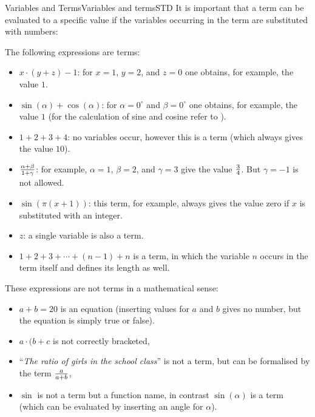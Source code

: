 \begin{MXContent}{Variables and Terms}{Variables and terms}{STD}
It is important that a term can be evaluated to a specific value if the variables occurring in the term are substituted 
with numbers:
\newpage
\begin{MExample}
The following expressions are terms:
\begin{itemize}
\item{$x\cdot (y+z)-1$: for $x=1$, $y=2$, and $z=0$ one obtains, for example, the value $1$.}
\item{$\sin(\alpha)+\cos(\alpha)$: for $\alpha=0^\circ$ and $\beta=0^\circ$ one obtains, for example, the value $1$ 
(for the calculation of sine and cosine refer to ).}
\item{$1+2+3+4$: no variables occur, however this is a term (which always gives the value $10$).}
\item{$\tfrac{\alpha+\beta}{1+\gamma}$: for example, $\alpha=1$, $\beta=2$, and $\gamma=3$ give the value 
$\tfrac{3}{4}$. But $\gamma=-1$ is not allowed.}
\item{$\sin(\pi (x+1))$: this term, for example, always gives the value zero if $x$ is substituted with an integer.}
\item{$z$: a single variable is also a term.}
\item{$1+2+3+\cdots+(n-1)+n$ is a term, in which the variable $n$ occurs in the term itself and defines 
its length as well.}
\end{itemize}
\end{MExample}

\begin{MExample}
These expressions are not terms in a mathematical sense:
\begin{itemize}
\item{$a+b=20$ is an equation (inserting values for $a$ and $b$ gives no number, but the equation is simply true or false).}
\item{$a\cdot (b+c$ is not correctly bracketed,}
\item{``\textit{The ratio of girls in the school class}'' is not a term, 
but can be formalised by the term $\tfrac{a}{a+b}$,}
\item{$\sin$ is not a term but a function name, in contrast $\sin(\alpha)$ is a term (which can be evaluated by 
inserting an angle for $\alpha$).}
\end{itemize}
\end{MExample}


\end{MXContent}
